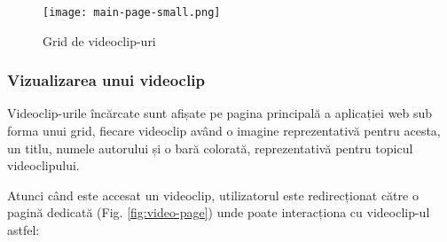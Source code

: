 \begin{figure}[h]
    \centering
    \texttt{[image: main-page-small.png]}
    \caption{Grid de videoclip-uri}
    \label{fig:video-grid}
\end{figure}

\subsubsection{Vizualizarea unui videoclip}
Videoclip-urile încărcate sunt afișate pe pagina principală a aplicației web sub forma
unui grid, fiecare videoclip având o imagine reprezentativă pentru acesta, un titlu,
numele autorului și o bară colorată, reprezentativă pentru topicul videoclipului.
\par
Atunci când este accesat un videoclip, utilizatorul este redirecționat către o pagină
dedicată (Fig. \ref{fig:video-page}) unde poate interacționa cu videoclip-ul astfel:
